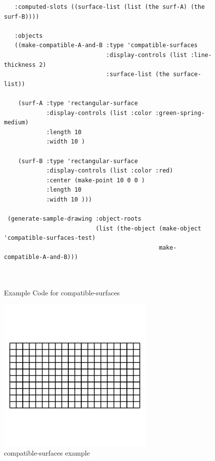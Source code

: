 \documentclass [11pt]{book}
\begin{document}
\begin{itemize}
\begin{figure}
\begin{lrbox}{\boxedverb}
\begin{minipage}{\linewidth}
{\begin{verbatim}
   :computed-slots ((surface-list (list (the surf-A) (the surf-B))))
  
   :objects
   ((make-compatible-A-and-B :type 'compatible-surfaces
                             :display-controls (list :line-thickness 2)
                             :surface-list (the surface-list))

    (surf-A :type 'rectangular-surface
            :display-controls (list :color :green-spring-medium)
            :length 10
            :width 10 )
                                        
    (surf-B :type 'rectangular-surface
            :display-controls (list :color :red)
            :center (make-point 10 0 0 )
            :length 10
            :width 10 )))

 (generate-sample-drawing :object-roots 
                          (list (the-object (make-object 'compatible-surfaces-test) 
                                            make-compatible-A-and-B)))
 
 
\end{verbatim}}
\end{minipage}
\end{lrbox}
\fbox{\usebox{\boxedverb}}

\caption{Example Code for compatible-surfaces}

\label{fig:example-code-compatible-surfaces}

\end{figure}

\begin{figure}
\begin{center}
\includegraphics[width=3in,height=3in]{../images/example-compatible-surfaces.pdf}
\end{center}

\caption{compatible-surfaces example}


\end{figure}
\end{itemize}
\end{document}
